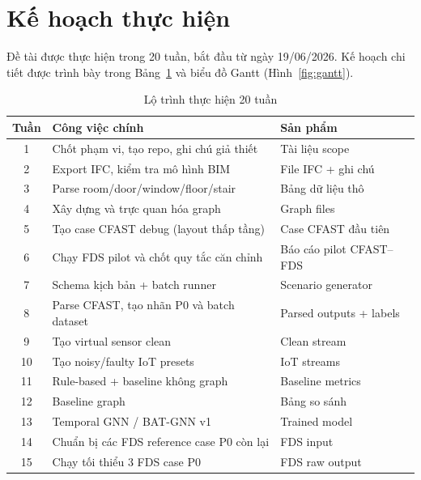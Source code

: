 \section{Kế hoạch thực hiện}
\label{sec:kehoachthuchien}

Đề tài được thực hiện trong 20 tuần, bắt đầu từ ngày 19/06/2026. Kế hoạch chi tiết được trình bày trong Bảng~\ref{tab:roadmap} và biểu đồ Gantt (Hình~\ref{fig:gantt}).

\begin{table}[H]
\centering
\caption{Lộ trình thực hiện 20 tuần}
\label{tab:roadmap}
\begin{tabularx}{\textwidth}{c X X}
\toprule
\textbf{Tuần} & \textbf{Công việc chính} & \textbf{Sản phẩm} \\
\midrule
1  & Chốt phạm vi, tạo repo, ghi chú giả thiết         & Tài liệu scope \\
2  & Export IFC, kiểm tra mô hình BIM                    & File IFC + ghi chú \\
3  & Parse room/door/window/floor/stair                  & Bảng dữ liệu thô \\
4  & Xây dựng và trực quan hóa graph                    & Graph files \\
5  & Tạo case CFAST debug (layout thấp tầng)             & Case CFAST đầu tiên \\
6  & Chạy FDS pilot và chốt quy tắc căn chỉnh           & Báo cáo pilot CFAST--FDS \\
7  & Schema kịch bản + batch runner                      & Scenario generator \\
8  & Parse CFAST, tạo nhãn P0 và batch dataset           & Parsed outputs + labels \\
9  & Tạo virtual sensor clean                            & Clean stream \\
10 & Tạo noisy/faulty IoT presets                        & IoT streams \\
11 & Rule-based + baseline không graph                   & Baseline metrics \\
12 & Baseline graph                                      & Bảng so sánh \\
13 & Temporal GNN / BAT-GNN v1                           & Trained model \\
14 & Chuẩn bị các FDS reference case P0 còn lại          & FDS input \\
15 & Chạy tối thiểu 3 FDS case P0                        & FDS raw output \\

\end{tabularx}
\end{table}
